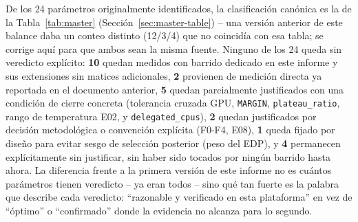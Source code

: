 De los 24 parámetros originalmente identificados, la clasificación
canónica es la de la Tabla~\ref{tab:master}
(Sección~\ref{sec:master-table}) -- una versión anterior de este balance
daba un conteo distinto (12/3/4) que no coincidía con esa tabla; se
corrige aquí para que ambos sean la misma fuente. Ninguno de los 24 queda
sin veredicto explícito: \textbf{10} quedan medidos con barrido dedicado
en este informe y sus extensiones sin matices adicionales, \textbf{2}
provienen de medición directa ya reportada en el documento anterior,
\textbf{5} quedan parcialmente justificados con una condición de cierre
concreta (tolerancia cruzada GPU, \texttt{MARGIN}, \texttt{plateau\_ratio},
rango de temperatura E02, y \texttt{delegated\_cpus}), \textbf{2} quedan
justificados por decisión metodológica o convención explícita (F0-F4, E08),
\textbf{1} queda fijado por diseño para evitar sesgo de selección
posterior (peso del EDP), y \textbf{4} permanecen explícitamente sin
justificar, sin haber sido tocados por ningún barrido hasta ahora. La
diferencia frente a la primera versión de este informe no es cuántos
parámetros tienen veredicto -- ya eran todos -- sino qué tan fuerte es la
palabra que describe cada veredicto: ``razonable y verificado en esta
plataforma'' en vez de ``óptimo'' o ``confirmado'' donde la evidencia no
alcanza para lo segundo.
